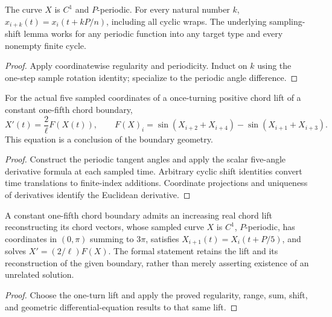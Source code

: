\begin{lemma}
\label{lem:angle-curve-api}
\leanok
{}
The curve $X$ is $C^1$ and $P$-periodic. For every natural number $k$,
$x_{i+k}(t)=x_i(t+kP/n)$, including all cyclic wraps.
The underlying sampling-shift lemma works for any periodic function into
any target type and every nonempty finite cycle.
\end{lemma}
\begin{proof}
\leanok
Apply coordinatewise regularity and periodicity. Induct on $k$ using the
one-step sample rotation identity; specialize to the periodic angle difference.
\end{proof}

\begin{theorem}
\label{thm:geometric-pentagon-ode}
\leanok
{}
For the actual five sampled coordinates of a once-turning positive chord
lift of a constant one-fifth chord boundary,
\[
 X'(t)=\frac2\ell F(X(t)),\qquad
 F(X)_i=\sin(X_{i+2}+X_{i+4})-\sin(X_{i+1}+X_{i+3}).
\]
This equation is a conclusion of the boundary geometry.
\end{theorem}
\begin{proof}
\leanok
Construct the periodic tangent angles and apply the scalar five-angle
derivative formula at each sampled time. Arbitrary cyclic shift identities
convert time translations to finite-index additions. Coordinate projections
and uniqueness of derivatives identify the Euclidean derivative.
\end{proof}

\begin{proposition}
\label{prop:pentagon-angle-solution}
\leanok
{}
A constant one-fifth chord boundary admits an increasing real chord lift
reconstructing its chord vectors, whose sampled curve $X$ is $C^1$,
$P$-periodic, has coordinates in $(0,\pi)$ summing to $3\pi$, satisfies
$X_{i+1}(t)=X_i(t+P/5)$, and solves $X'=(2/\ell)F(X)$.
The formal statement retains the lift and its reconstruction of the given
boundary, rather than merely asserting existence of an unrelated solution.
\end{proposition}
\begin{proof}
\leanok
Choose the one-turn lift and apply the proved regularity, range, sum,
shift, and geometric differential-equation results to that same lift.
\end{proof}

